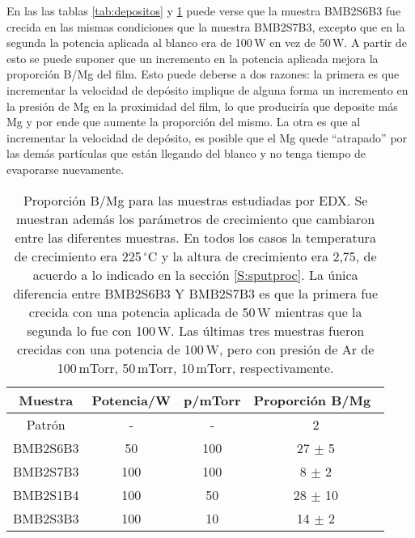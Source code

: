 En las las tablas \ref{tab:depositos} y \ref{tab:composicionSEM} puede verse que la muestra BMB2S6B3 fue crecida en las mismas condiciones que la muestra BMB2S7B3, excepto que en la segunda la potencia aplicada al blanco era de 100\,W en vez de 50\,W. A partir de esto se puede suponer que un incremento en la potencia aplicada mejora la proporción B/Mg del film. Esto puede deberse a dos razones: la primera es que incrementar la velocidad de depósito implique de alguna forma un incremento en la presión de Mg en la proximidad del film, lo que produciría que deposite más Mg y por ende que aumente la proporción del mismo. La otra es que al incrementar la velocidad de depósito, es posible que el Mg quede ``atrapado'' por las demás partículas que están llegando del blanco y no tenga tiempo de evaporarse nuevamente.
 \begin{table}[h!]
  \centering
  \begin{tabular}{|c|c|c|c|}\hline
	Muestra	& Potencia/W & p/mTorr & Proporción B/Mg\ \\ \hline
	Patrón & - & - & 2 \\
	BMB2S6B3 & 50 & 100 & 27 $\pm$ 5 \\
	BMB2S7B3 & 100 & 100 & 8 $\pm$ 2 \\ 
	BMB2S1B4 & 100 & 50 & 28 $\pm$ 10 \\
	BMB2S3B3 & 100 & 10 & 14 $\pm$ 2 \\ \hline
  \end{tabular}
  \caption[Proporción B/Mg para las muestras estudiadas por EDX.]{Proporción B/Mg para las muestras estudiadas por EDX. Se muestran además los parámetros de crecimiento que cambiaron entre las diferentes muestras. En todos los casos la temperatura de crecimiento era 225\,$^{\circ}$C y la altura de crecimiento era 2,75, de acuerdo a lo indicado en la sección \ref{S:sputproc}. La única diferencia entre BMB2S6B3 Y BMB2S7B3 es que la primera fue crecida con una potencia aplicada de 50\,W mientras que la segunda lo fue con 100\,W. Las últimas tres muestras fueron crecidas con una potencia de 100\,W, pero con presión de Ar de 100\,mTorr, 50\,mTorr, 10\,mTorr, respectivamente.}
  \label{tab:composicionSEM}
\end{table}
{}

